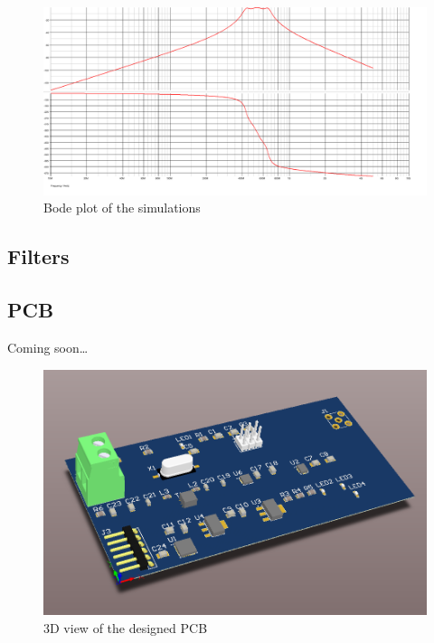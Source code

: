 \documentclass[a4paper, openany, oneside]{memoir}
\begin{document}
\begin{figure}[h]
    \centering
    \includegraphics[width=\textwidth]{bode.pdf}
    \caption{Bode plot of the simulations}
    \label{fig:sim_bode}
\end{figure}





\subsection{Filters}




\subsection{PCB}
Coming soon\ldots

\begin{figure}[h]
    \centering
    \includegraphics[width=\textwidth]{pcb.png}
    \caption{3D view of the designed PCB}
    \label{fig:pcb_3d}
\end{figure}
\end{document}
